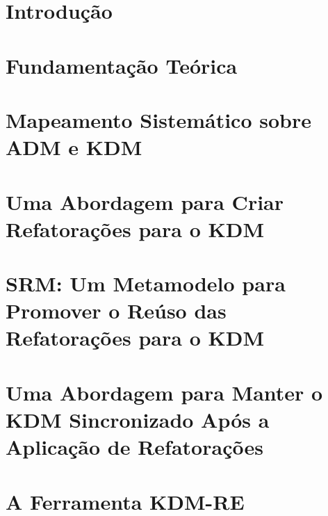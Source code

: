 \documentclass[doutorado, pre-defesa, spanish, english, brazil]{packages/icmc}
\begin{document}
\textual

\chapter{Introdução}
\label{chapter:introducao}


\chapter{Fundamentação Teórica}
\label{chapter:fundamentacao_teorica}


%

\chapter{Mapeamento Sistemático sobre ADM e KDM}\label{chapter:mapeamento_sistematico}


\chapter{Uma Abordagem para Criar Refatorações para o KDM}\label{chapter:catalogo_refactoring_KDM}


\chapter{SRM: Um Metamodelo para Promover o Reúso das Refatorações para o KDM}
\label{chapter:Toward_a_Refactoring_Metamodel_for_KDM}


\chapter{Uma Abordagem para Manter o KDM Sincronizado Após a Aplicação de Refatorações}\label{chapter:Abordagem_de_sincronizacao}


\chapter{A Ferramenta KDM-RE}\label{chapter:ferramenta_kdm_re}

\end{document}
